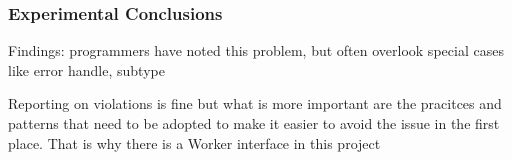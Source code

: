 


\subsubsection{Experimental Conclusions}
Findings: programmers have noted this problem, but often overlook special cases like error handle, subtype

 Reporting on violations is fine but what is more important are the pracitces and patterns that need to be adopted to make it easier to avoid the issue in the first place. That is why there is a Worker interface in this project
